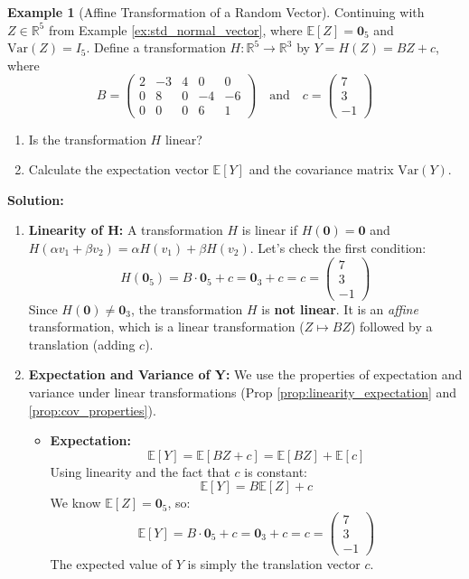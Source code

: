 \documentclass[11pt]{article}
\theoremstyle{definition}
\newtheorem{example}[theorem]{Example}
\newcommand{\R}{\mathbb{R}} %
\newcommand{\E}{\mathbb{E}} %
\newcommand{\Var}{\mathrm{Var}} %
\newcommand{\bZero}{\mathbf{0}} %
\begin{document}
\begin{example}[Affine Transformation of a Random Vector]
\label{ex:affine_transformation}
Continuing with $Z \in \R^5$ from Example \ref{ex:std_normal_vector}, where $\E[Z]=\bZero_5$ and $\Var(Z)=I_5$.
Define a transformation $H: \R^5 \to \R^3$ by $Y = H(Z) = BZ + c$, where
\[
B = \begin{pmatrix} 2 & -3 & 4 & 0 & 0 \\ 0 & 8 & 0 & -4 & -6 \\ 0 & 0 & 0 & 6 & 1 \end{pmatrix} \quad \text{and} \quad c = \begin{pmatrix} 7 \\ 3 \\ -1 \end{pmatrix}
\]
\begin{enumerate}
    \item Is the transformation $H$ linear?
    \item Calculate the expectation vector $\E[Y]$ and the covariance matrix $\Var(Y)$.
\end{enumerate}

\textbf{Solution:}
\begin{enumerate}
    \item \textbf{Linearity of H:} A transformation $H$ is linear if $H(\bZero) = \bZero$ and $H(\alpha v_1 + \beta v_2) = \alpha H(v_1) + \beta H(v_2)$. Let's check the first condition:
    \[ H(\bZero_5) = B \cdot \bZero_5 + c = \bZero_3 + c = c = \begin{pmatrix} 7 \\ 3 \\ -1 \end{pmatrix} \]
    Since $H(\bZero) \neq \bZero_3$, the transformation $H$ is \textbf{not linear}. It is an \textit{affine} transformation, which is a linear transformation ($Z \mapsto BZ$) followed by a translation (adding $c$).

    \item \textbf{Expectation and Variance of Y:} We use the properties of expectation and variance under linear transformations (Prop \ref{prop:linearity_expectation} and \ref{prop:cov_properties}).
    \begin{itemize}
        \item \textbf{Expectation:}
        \[ \E[Y] = \E[BZ + c] = \E[BZ] + \E[c] \]
        Using linearity and the fact that $c$ is constant:
        \[ \E[Y] = B\E[Z] + c \]
        We know $\E[Z] = \bZero_5$, so:
        \[ \E[Y] = B \cdot \bZero_5 + c = \bZero_3 + c = c = \begin{pmatrix} 7 \\ 3 \\ -1 \end{pmatrix} \]
        The expected value of $Y$ is simply the translation vector $c$.


\end{itemize}
\end{enumerate}
\end{example}
\end{document}
